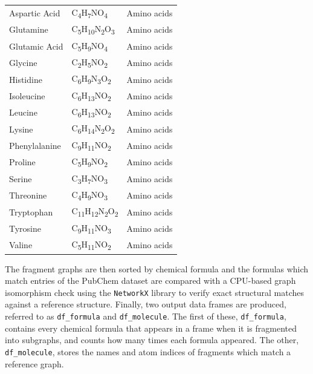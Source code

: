\begin{table}[h!]
\begin{tabularx}{0.49\textwidth}{l l l}
Aspartic Acid  &    C\textsubscript{4}H\textsubscript{7}NO\textsubscript{4} & Amino acids \\
Glutamine  &  C\textsubscript{5}H\textsubscript{10}N\textsubscript{2}O\textsubscript{3} & Amino acids \\
Glutamic Acid  &    C\textsubscript{5}H\textsubscript{9}NO\textsubscript{4} & Amino acids \\
Glycine  &    C\textsubscript{2}H\textsubscript{5}NO\textsubscript{2} & Amino acids \\
Histidine  &   C\textsubscript{6}H\textsubscript{9}N\textsubscript{3}O\textsubscript{2} & Amino acids \\
Isoleucine  &   C\textsubscript{6}H\textsubscript{13}NO\textsubscript{2} & Amino acids \\
Leucine  &   C\textsubscript{6}H\textsubscript{13}NO\textsubscript{2} & Amino acids \\
Lysine  &  C\textsubscript{6}H\textsubscript{14}N\textsubscript{2}O\textsubscript{2} & Amino acids \\
Phenylalanine  &   C\textsubscript{9}H\textsubscript{11}NO\textsubscript{2} & Amino acids \\
Proline  &    C\textsubscript{5}H\textsubscript{9}NO\textsubscript{2} & Amino acids \\
Serine  &    C\textsubscript{3}H\textsubscript{7}NO\textsubscript{3} & Amino acids \\
Threonine  &    C\textsubscript{4}H\textsubscript{9}NO\textsubscript{3} & Amino acids \\
Tryptophan  & C\textsubscript{11}H\textsubscript{12}N\textsubscript{2}O\textsubscript{2} & Amino acids \\
Tyrosine  &   C\textsubscript{9}H\textsubscript{11}NO\textsubscript{3} & Amino acids \\
Valine  &   C\textsubscript{5}H\textsubscript{11}NO\textsubscript{2} & Amino acids \\
\bottomrule
\end{tabularx}
\end{table}

The fragment graphs are then sorted by chemical formula and the formulas which match entries of the PubChem dataset are compared with a CPU-based graph isomorphism check using the \verb|NetworkX| \cite{networkx} library to verify exact structural matches against a reference structure.
Finally, two output data frames are produced, referred to as \verb|df_formula| and \verb|df_molecule|.
The first of these, \verb|df_formula|, contains every chemical formula that appears in a frame when it is fragmented into subgraphs, and counts how many times each formula appeared.
The other, \verb|df_molecule|, stores the names and atom indices of fragments which match a reference graph.


